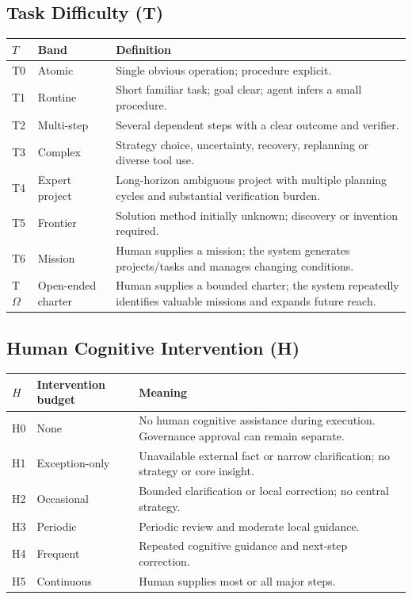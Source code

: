 \documentclass[11pt]{article}
\theoremstyle{definition}
\newcommand{\Om}{\ensuremath{\Omega}}
\begin{document}
\subsection{Task Difficulty (T)}

\begin{table}[h]
\centering\small
\begin{tabularx}{\textwidth}{@{}llY@{}}
\toprule
$T$ & Band & Definition \\
\midrule
T0 & Atomic & Single obvious operation; procedure explicit. \\
T1 & Routine & Short familiar task; goal clear; agent infers a small procedure. \\
T2 & Multi-step & Several dependent steps with a clear outcome and verifier. \\
T3 & Complex & Strategy choice, uncertainty, recovery, replanning or diverse tool use. \\
T4 & Expert project & Long-horizon ambiguous project with multiple planning cycles and substantial verification burden. \\
T5 & Frontier & Solution method initially unknown; discovery or invention required. \\
T6 & Mission & Human supplies a mission; the system generates projects/tasks and manages changing conditions. \\
T\Om{} & Open-ended charter & Human supplies a bounded charter; the system repeatedly identifies valuable missions and expands future reach. \\
\bottomrule
\end{tabularx}
\end{table}

\subsection{Human Cognitive Intervention (H)}

\begin{table}[h]
\centering\small
\begin{tabularx}{\textwidth}{@{}llY@{}}
\toprule
$H$ & Intervention budget & Meaning \\
\midrule
H0 & None & No human cognitive assistance during execution. Governance approval can remain separate. \\
H1 & Exception-only & Unavailable external fact or narrow clarification; no strategy or core insight. \\
H2 & Occasional & Bounded clarification or local correction; no central strategy. \\
H3 & Periodic & Periodic review and moderate local guidance. \\
H4 & Frequent & Repeated cognitive guidance and next-step correction. \\
H5 & Continuous & Human supplies most or all major steps. \\
\bottomrule
\end{tabularx}
\end{table}
\end{document}
